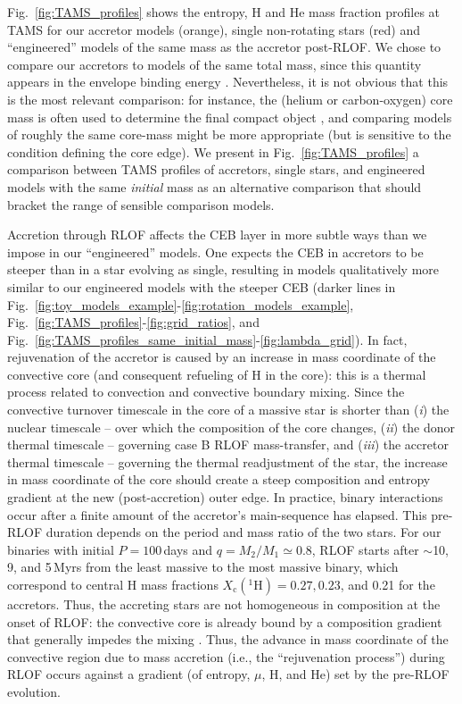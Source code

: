 \documentclass[twocolumn,twocolappendix,trackchanges]{aastex63}
\DeclareRobustCommand{\Eqref}[1]{Eq.~\ref{#1}}
\DeclareRobustCommand{\Figref}[1]{Fig.~\ref{#1}}
\begin{document}
{\Figref{fig:TAMS_profiles} shows the entropy, H and He mass fraction
profiles at TAMS for our accretor models (orange), single non-rotating
stars (red) and ``engineered'' models of the same mass as the accretor
post-RLOF. We chose to compare our accretors to models of the same
total mass, since this quantity appears in the envelope binding energy
\citep[see \Eqref{eq:BE} and e.g.,][]{dekool:1990, dewi:2000}.
Nevertheless, it is not obvious that this is the most relevant
comparison: for instance, the (helium or carbon-oxygen) core mass is often
used to determine the final compact object \citep[e.g.,][]{fryer:2012,
  farmer:2019, patton:2021, renzo:2022, fryer:2022}, and comparing models of roughly the same
core-mass might be more appropriate (but is sensitive to the condition
defining the core edge). We present in
\Figref{fig:TAMS_profiles} a comparison between TAMS
profiles of accretors, single stars, and engineered models with the
same \emph{initial} mass as an alternative comparison that should bracket the
range of sensible comparison models.

Accretion through RLOF affects the CEB layer in more subtle ways than
we impose in our ``engineered'' models. One expects the CEB in
accretors to be steeper than in a star evolving as single, resulting
in models qualitatively more similar to our engineered models with the
steeper CEB (darker lines in
\Figref{fig:toy_models_example}-\ref{fig:rotation_models_example},
\Figref{fig:TAMS_profiles}-\ref{fig:grid_ratios}, and \Figref{fig:TAMS_profiles_same_initial_mass}-\ref{fig:lambda_grid}). In fact, rejuvenation of the accretor is caused by an
increase in mass coordinate of the convective core (and consequent
refueling of H in the core): this is a thermal process related to
convection and convective boundary mixing. Since the convective
turnover timescale in the core of a massive star is shorter than
(\emph{i}) the nuclear timescale -- over which the composition of the
core changes, (\emph{ii}) the donor thermal timescale -- governing
case B RLOF mass-transfer, and (\emph{iii}) the accretor thermal
timescale -- governing the thermal readjustment of the star, the
increase in mass coordinate of the core should create a steep
composition and entropy gradient at the new (post-accretion) outer
edge. In practice, binary interactions occur after a finite amount of
the accretor's main-sequence has elapsed. This pre-RLOF duration
depends on the period and mass ratio of the two stars. For our
binaries with initial $P=100$\,days and $q=M_2/M_1\simeq 0.8$, RLOF
starts after $\sim{}$10, 9, and 5\,Myrs from the least massive to the
most massive binary, which correspond to central H mass fractions
$X_\mathrm{c}(^1\mathrm{H}) = 0.27, 0.23$, and 0.21 for the accretors.
Thus, the accreting stars are not homogeneous in composition at the
onset of RLOF: the convective core is already bound by a composition
gradient that generally impedes the mixing \citep[e.g.,][]{yoon:05}.
Thus, the advance in mass coordinate of the convective region due to mass accretion (i.e., the ``rejuvenation process'') during RLOF occurs against a gradient (of entropy,
$\mu$, H, and He) set by the pre-RLOF evolution.

}
\end{document}
